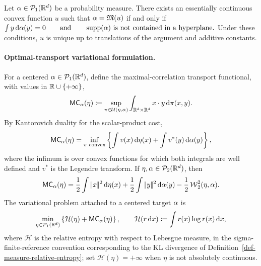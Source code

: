 \begin{thm}\label{thm-moment-measure-characterization}
Let $\alpha\in\mathcal{P}_1(\mathbb{R}^d)$ be a probability measure. There exists an essentially continuous convex function $u$ such that $\alpha=\mathfrak M(u)$ if and only if
\(\int y\,\mathrm{d}\alpha(y)=0 \qquad\text{and}\qquad \operatorname{supp}(\alpha)\text{ is not contained in a hyperplane.}\)
Under these conditions, $u$ is unique up to translations of the argument and additive constants.
\end{thm}
\paragraph{Optimal-transport variational formulation.}
For a centered $\alpha\in\mathcal{P}_1(\mathbb{R}^d)$, define the maximal-correlation transport functional, with values in $\mathbb{R}\cup\{+\infty\}$,
\begin{equation}\label{eq-moment-max-correlation}
\mathsf{MC}_\alpha(\eta)
\coloneqq
\sup_{\pi\in\mathcal{U}(\eta,\alpha)}
\int_{\mathbb{R}^d\times\mathbb{R}^d} x\cdot y\,\mathrm{d}\pi(x,y).
\end{equation}
By Kantorovich duality for the scalar-product cost,
\begin{equation}\label{eq-moment-max-correlation-dual}
\mathsf{MC}_\alpha(\eta)
=
\inf_{v\ \mathrm{convex}}
\left\{
\int v(x)\,\mathrm{d}\eta(x)+\int v^*(y)\,\mathrm{d}\alpha(y)
\right\},
\end{equation}
where the infimum is over convex functions for which both integrals are well defined and $v^*$ is the Legendre transform. If $\eta,\alpha\in\mathcal{P}_2(\mathbb{R}^d)$, then
\begin{equation}\label{eq-moment-correlation-w2}
\mathsf{MC}_\alpha(\eta)
=
\frac12\int |\!| x |\!|^2\,\mathrm{d}\eta(x)
+
\frac12\int |\!| y |\!|^2\,\mathrm{d}\alpha(y)
-
\frac12\operatorname{\mathcal{W}}_2^2(\eta,\alpha).
\end{equation}
The variational problem attached to a centered target $\alpha$ is
\begin{equation}\label{eq-moment-measure-variational}
\min_{\eta\in\mathcal{P}_1(\mathbb{R}^d)}
\left\{
\mathcal H(\eta)+\mathsf{MC}_\alpha(\eta)
\right\},
\qquad
\mathcal H(r\,\mathrm{d} x)\coloneqq \int r(x)\log r(x)\,\mathrm{d} x,
\end{equation}
where $\mathcal H$ is the relative entropy with respect to Lebesgue measure, in the sigma-finite-reference convention corresponding to the KL divergence of Definition~\ref{def-measure-relative-entropy}; set $\mathcal H(\eta)=+\infty$ when $\eta$ is not absolutely continuous.

